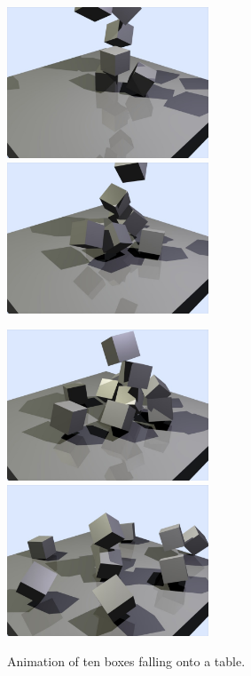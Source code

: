 \begin{figure}[p]
\centerline{\includegraphics[width=60mm,height=45mm]{figures/boxes1} \hspace{5mm}
            \includegraphics[width=60mm,height=45mm]{figures/boxes2}}\vspace{5mm}
\centerline{\includegraphics[width=60mm,height=45mm]{figures/boxes3} \hspace{5mm}
            \includegraphics[width=60mm,height=45mm]{figures/boxes4}}
\caption{Animation of ten boxes falling onto a table.\label{sampleBoxes}}
\end{figure}

